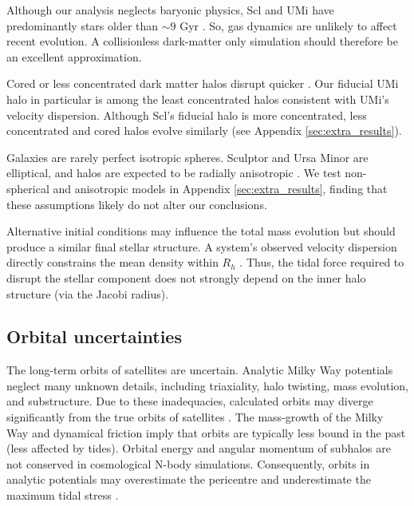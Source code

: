 Although our analysis neglects baryonic physics, Scl and UMi have
predominantly stars older than \(\sim 9\) Gyr
\citep{carrera+2002, deboer+2011, weisz+2014, delosreyes+2022, sato+2025}.
So, gas dynamics are unlikely to affect recent evolution. A
collisionless dark-matter only simulation should therefore be an
excellent approximation.

Cored or less concentrated dark matter halos disrupt quicker
\citep[e.g.,][]{stucker+2023}. Our fiducial UMi halo in particular is
among the least concentrated halos consistent with UMi's velocity
dispersion. Although Scl's fiducial halo is more concentrated, less
concentrated and cored halos evolve similarly (see Appendix
\ref{sec:extra_results}).

Galaxies are rarely perfect isotropic spheres. Sculptor and Ursa Minor
are elliptical, and halos are expected to be radially anisotropic
\citep[e.g.,][]{navarro+2010}. We test non-spherical and anisotropic
models in Appendix \ref{sec:extra_results}, finding that these
assumptions likely do not alter our conclusions.

Alternative initial conditions may influence the total mass evolution
but should produce a similar final stellar structure. A system's
observed velocity dispersion directly constrains the mean density within
\(R_h\) \citep[e.g.,][]{wolf+2010}. Thus, the tidal force required to
disrupt the stellar component does not strongly depend on the inner halo
structure (via the Jacobi radius).

\subsection{Orbital uncertainties}\label{sec:scl_umi_orbit_uncert}

The long-term orbits of satellites are uncertain. Analytic Milky Way
potentials neglect many unknown details, including triaxiality, halo
twisting, mass evolution, and substructure. Due to these inadequacies,
calculated orbits may diverge significantly from the true orbits of
satellites \citep[e.g.,][]{dsouza+bell2022}. The mass-growth of the
Milky Way and dynamical friction imply that orbits are typically less
bound in the past (less affected by tides). Orbital energy and angular
momentum of subhalos are not conserved in cosmological N-body
simulations. Consequently, orbits in analytic potentials may
overestimate the pericentre and underestimate the maximum tidal stress
\citep[although typically not by enough to change our
conclusions,][]{santistevan+2023, santistevan+2024}.


